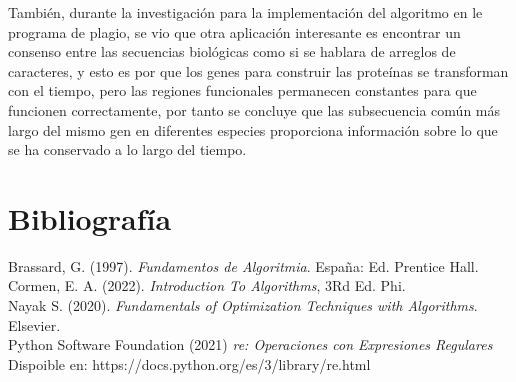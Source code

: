 \documentclass[12pt,twoside]{article}
\begin{document}
    También, durante la investigaci\'on para la implementaci\'on del algoritmo en le programa de plagio, se vio que otra aplicación interesante es encontrar un consenso entre las secuencias biológicas como si se hablara de arreglos de caracteres, y esto es por que los genes para construir las prote\'inas se transforman con el tiempo, pero las regiones funcionales permanecen constantes para que funcionen correctamente, por tanto se concluye que las subsecuencia com\'un m\'as largo del mismo gen en diferentes especies proporciona informaci\'on sobre lo que se ha conservado a lo largo del tiempo.
\section{Bibliograf\'ia}
Brassard, G. (1997). \textit {Fundamentos de Algoritmia}. España: Ed. Prentice Hall.\\[0.4cm]
Cormen, E. A. (2022). \textit{Introduction To Algorithms}, 3Rd Ed. Phi.\\[0.4cm]
Nayak S. (2020). {\it Fundamentals of Optimization Techniques with Algorithms}. Elsevier.\\[0.4cm]
Python Software Foundation (2021) {\it re: Operaciones con Expresiones Regulares} Dispoible en: https://docs.python.org/es/3/library/re.html
\medskip
\end{document}

